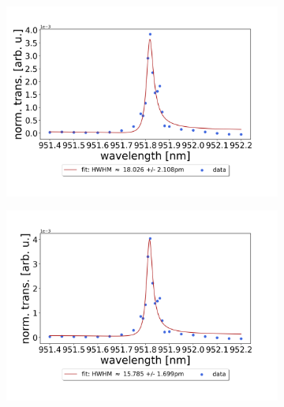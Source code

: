 \begin{figure}[h!]
    \centering
    \begin{subfigure}[b]{0.49\textwidth}
        \includegraphics[width=\textwidth]{figures/results/single fano fits/120um_M5_fit_1.png}
        \caption{}
        \label{fig:120um_M5_fit_1}
    \end{subfigure}
    \begin{subfigure}[b]{0.49\textwidth}
        \includegraphics[width=\textwidth]{figures/results/single fano fits/120um_M5_fit_2.png}
        \caption{}
        \label{fig:120um_M5_fit_2}
    \end{subfigure}
    \begin{subfigure}[b]{0.49\textwidth}

\end{subfigure}
\end{figure}
